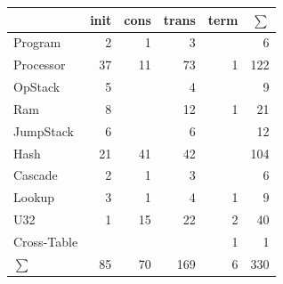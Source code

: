 \documentclass{article}
\begin{document}
\begin{minipage}{0.5\textwidth}
    \hfill
    \begin{tabular}{lrrrrr}
        \toprule
                    & init & cons & trans & term & $\sum$ \\ \midrule
        Program     &    2 &    1 &     3 &      &      6 \\
        Processor   &   37 &   11 &    73 &    1 &    122 \\
        OpStack     &    5 &      &     4 &      &      9 \\
        Ram         &    8 &      &    12 &    1 &     21 \\
        JumpStack   &    6 &      &     6 &      &     12 \\
        Hash        &   21 &   41 &    42 &      &    104 \\
        Cascade     &    2 &    1 &     3 &      &      6 \\
        Lookup      &    3 &    1 &     4 &    1 &      9 \\
        U32         &    1 &   15 &    22 &    2 &     40 \\
        Cross-Table &      &      &       &    1 &      1 \\ \bottomrule
        $\sum$      &   85 &   70 &   169 &    6 &    330
    \end{tabular}
\end{minipage}
\end{document}
